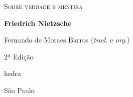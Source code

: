 




\begingroup\thispagestyle{empty}\vspace*{.05\textheight}\parindent=0pt
              \formular
              \Huge 
              \textsc{Sobre verdade e mentira}
              \medskip
                      
              \large
              \normalsize 
              \vspace{2em}

              \Large
              \textbf{Friedrich Nietzsche}
              \bigskip

              \small
              Fernando de Moraes Barros (\textit{trad.} e \textit{org.})\\
              \vspace{3em}

   					  2ª Edição
                      

              \vfill

              \newfontfamily{}
              {\fontsize{30}{40}\selectfont \timesnewroman hedra}
              \smallskip

              \small
              São Paulo \the\year
\endgroup
\pagebreak
